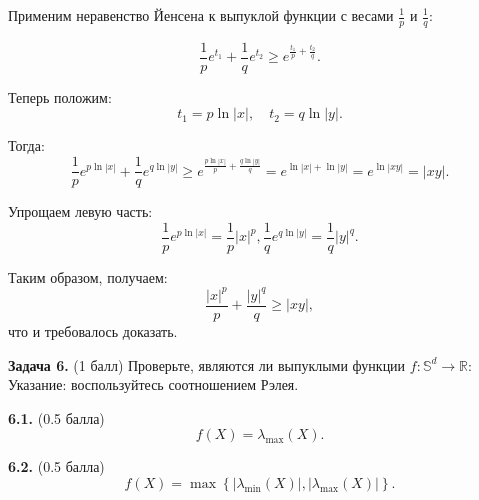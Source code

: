 \documentclass{article}
\begin{document}
Применим неравенство Йенсена к выпуклой функции с весами $\frac{1}{p}$ и $\frac{1}{q}$:

$$
\frac{1}{p} e^{t_1} + \frac{1}{q} e^{t_2} \geq e^{\frac{t_1}{p} + \frac{t_2}{q}}.
$$

Теперь положим:
$$
t_1 = p \ln |x|, \quad t_2 = q \ln |y|.
$$

Тогда:
$$
\frac{1}{p} e^{p \ln |x|} + \frac{1}{q} e^{q \ln |y|} \geq e^{\frac{p \ln |x|}{p} + \frac{q \ln |y|}{q}} = e^{\ln |x| + \ln |y|} = e^{\ln |xy|} = |xy|.
$$

Упрощаем левую часть:
$$
\frac{1}{p} e^{p \ln |x|} = \frac{1}{p} |x|^p, \frac{1}{q} e^{q \ln |y|} = \frac{1}{q} |y|^q.
$$

Таким образом, получаем:
$$
\frac{|x|^p}{p} + \frac{|y|^q}{q} \geq |xy|,
$$
что и требовалось доказать.


\textbf{Задача 6.} (1 балл) Проверьте, являются ли выпуклыми функции \( f : \mathbb{S}^d \to \mathbb{R} \):  
Указание: воспользуйтесь соотношением Рэлея.

\textbf{6.1.} (0.5 балла)
\[
f(X) = \lambda_{\max}(X).
\]

\textbf{6.2.} (0.5 балла)
\[
f(X) = \max \left\{ |\lambda_{\min}(X)|, |\lambda_{\max}(X)| \right\}.
\]
\end{document}
